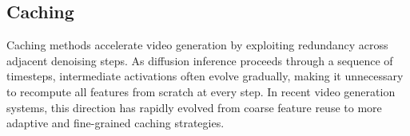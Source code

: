 \documentclass[lettersize,journal]{IEEEtran}
\begin{document}
\subsection{Caching}
\label{subsec:caching}




Caching methods accelerate video generation by exploiting redundancy across adjacent denoising steps. As diffusion inference proceeds through a sequence of timesteps, intermediate activations often evolve gradually, making it unnecessary to recompute all features from scratch at every step. In recent video generation systems, this direction has rapidly evolved from coarse feature reuse to more adaptive and fine-grained caching strategies.
\end{document}
